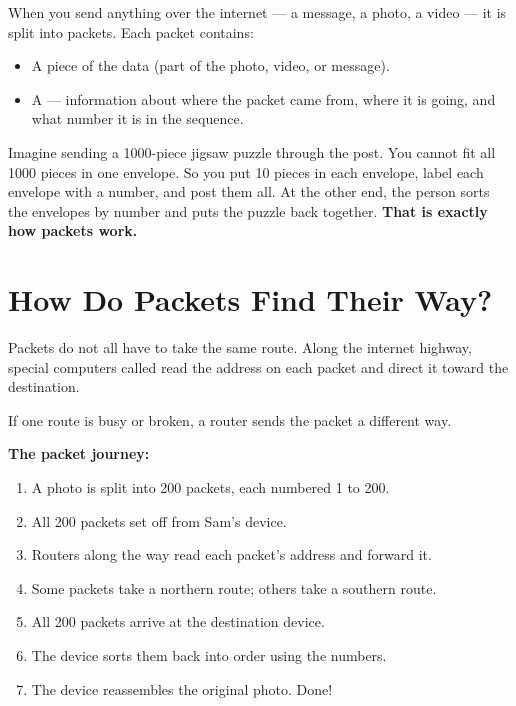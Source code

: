 When you send anything over the internet — a message, a photo, a video — it is split into packets.
Each packet contains:
\begin{itemize}
  \item A piece of the data (part of the photo, video, or message).
  \item A  — information about where the packet came from, where it is going,
        and what number it is in the sequence.
\end{itemize}

\begin{picturethis}
  Imagine sending a 1000-piece jigsaw puzzle through the post.
  You cannot fit all 1000 pieces in one envelope.
  So you put 10 pieces in each envelope, label each envelope with a number,
  and post them all.
  At the other end, the person sorts the envelopes by number
  and puts the puzzle back together.
  \textbf{That is exactly how packets work.}
\end{picturethis}

\sectionrule

\section*{How Do Packets Find Their Way?}

Packets do not all have to take the same route.
Along the internet highway, special computers called  read the address on each packet
and direct it toward the destination.

If one route is busy or broken, a router sends the packet a different way.

\begin{quickmap}
  \textbf{The packet journey:}
  \begin{enumerate}[label=\textbf{\arabic*.}]
    \item A photo is split into 200 packets, each numbered 1 to 200.
    \item All 200 packets set off from Sam's device.
    \item Routers along the way read each packet's address and forward it.
    \item Some packets take a northern route; others take a southern route.
    \item All 200 packets arrive at the destination device.
    \item The device sorts them back into order using the numbers.
    \item The device reassembles the original photo. Done!
  \end{enumerate}
\end{quickmap}

